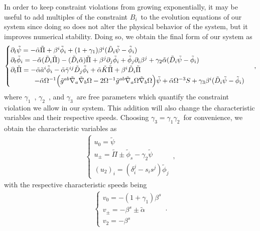 In order to keep constraint violations from growing exponentially, it may be useful to add multiples of the constraint $B_i$~to the evolution equations of our system since doing so does not alter the physical behavior of the system, but it improves numerical stability. Doing so, we obtain the final form of our system as
%
\begin{align}
    \begin{cases}
        \partial_t \tilde{\psi} = - \tilde{\alpha} \tilde{\Pi} + \beta^i \tilde{\phi}_i + (1 + \gamma_1) \beta^i (\tilde{D}_i \tilde{\psi} - \tilde{\phi}_i) \\
        \partial_t \tilde{\phi}_i = - \tilde{\alpha} (\tilde{D}_i \tilde{\Pi}) - (\tilde{D}_i \tilde{\alpha}) \tilde{\Pi} + \beta^j \partial_j \tilde{\phi}_i + \tilde{\phi}_j \partial_i \beta^j + \gamma_2 \tilde{\alpha} (\tilde{D}_i \tilde{\psi} - \tilde{\phi}_i) \\
        \partial_t \tilde{\Pi} = - \tilde{\alpha} \tilde{a}^i \tilde{\phi}_i - \tilde{\alpha} \tilde{\gamma}^{ij} \tilde{D}_j \tilde{\phi}_i + \tilde{\alpha} \tilde{K} \tilde{\Pi} + \beta^i \tilde{D}_i \tilde{\Pi} \\
        \hspace{3.5em} - \tilde{\alpha} \Omega^{-1} \Big( \tilde{g}^{ab} \tilde{\nabla}_a \tilde{\nabla}_b \Omega - 2 \Omega^{-1} \tilde{g}^{ab} \tilde{\nabla}_a \Omega \tilde{\nabla}_b \Omega \Big) \tilde{\psi} + \tilde{\alpha} \Omega^{-3} S + \gamma_3 \beta^i (\tilde{D}_i \tilde{\psi} - \tilde{\phi}_i)
    \end{cases}\,,
    \label{eq:wave_equation_constraint_violation}
\end{align}
%
where $\gamma_1$~, $\gamma_2$~, and $\gamma_3$~are free parameters which quantify the constraint violation we allow in our system. This addition will also change the characteristic variables and their respective speeds. Choosing $\gamma_3 = \gamma_1 \gamma_2$~for convenience, we obtain the characteristic variables as
%
\begin{align}
    \begin{cases}
        u_0 = \tilde{\psi} \\
        u_\pm = \tilde{\Pi} \pm \tilde{\phi}_s - \gamma_2 \tilde{\psi} \\
        (u_2)_i = (\delta_i^j - s_i s^j) \tilde{\phi}_j
    \end{cases}\,,
\end{align}
%
with the respective characteristic speeds being
%
\begin{align}
    \begin{cases}
        v_0 = - (1 + \gamma_1) \beta^s \\
        v_\pm = -\beta^s \pm \tilde{\alpha} \\
        v_2 = -\beta^s
    \end{cases}\,.
\end{align}


